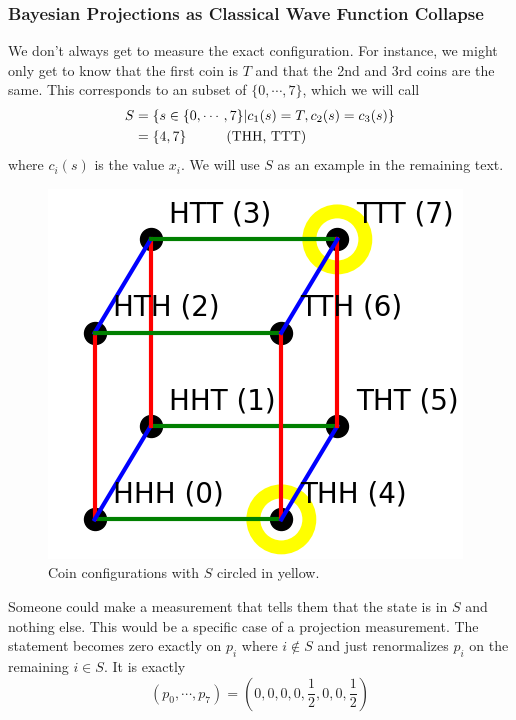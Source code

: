 \documentclass[12pt,a4paper]{article}
\begin{document}
\subsubsection{Bayesian Projections as Classical Wave Function Collapse}
\label{proj}
We don't always get to measure the exact configuration.  For instance, we might only get to know that the first coin is $T$ and that the 2nd and 3rd coins are the same.  This corresponds to an subset of $\{0,\cdots,7\}$, which we will call
\[
\begin{split}
  S &= \{s \in \{0,\cdots,7\} | c_1(s) = T, c_2(s) = c_3(s) \} \\
    & = \{4,7\} \hspace{0.4 in} \text{(THH, TTT)}
\end{split}
\]
where $c_i(s)$ is the value $x_i$.  We will use $S$ as an example in the remaining text.

\begin{figure}[h]
\centering
\includegraphics[scale=0.6]{cube.png}
\caption{Coin configurations with $S$ circled in yellow.}
\label{masslessshell}
\end{figure}

Someone could make a measurement that tells them that the state is in $S$ and nothing else.  This would be a specific case of a projection measurement.  The statement becomes zero exactly on $p_i$ where $i \not \in S$ and just renormalizes $p_i$ on the remaining $i \in S$.  It is exactly
\begin{equation}
\label{sdist}
(p_0,\cdots,p_7) = \left(0,0,0,0,\frac{1}{2},0,0,\frac{1}{2}\right)
\end{equation}
\end{document}
